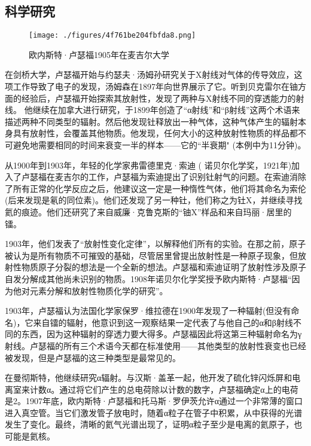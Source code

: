 \subsection{科学研究}
\begin{figure}[ht]
\centering
\texttt{[image: ./figures/4f761be204fbfda8.png]}
\caption{欧内斯特·卢瑟福1905年在麦吉尔大学} \label{fig_Ernest_4}
\end{figure}

在剑桥大学，卢瑟福开始与约瑟夫·汤姆孙研究关于X射线对气体的传导效应，这项工作导致了电子的发现，汤姆森在1897年向世界展示了它。听到贝克雷尔在铀方面的经验后，卢瑟福开始探索其放射性，发现了两种与X射线不同的穿透能力的射线。 他继续在加拿大进行研究，于1899年创造了“α射线”和“β射线”这两个术语来描述两种不同类型的辐射。然后他发现钍释放出一种气体，这种气体产生的辐射本身具有放射性，会覆盖其他物质。他发现，任何大小的这种放射性物质的样品都不可避免地需要相同的时间来衰变一半的样本——它的“半衰期" (本例中为11分钟)。

从1900年到1903年，年轻的化学家弗雷德里克·索迪 ( 诺贝尔化学奖，1921年)加入了卢瑟福在麦吉尔的工作，卢瑟福为索迪提出了识别钍射气的问题。在索迪消除了所有正常的化学反应之后，他建议这一定是一种惰性气体，他们将其命名为索伦(后来发现是氡的同位素)。他们还发现了另一种钍，他们称之为钍X，并继续寻找氦的痕迹。他们还研究了来自威廉·克鲁克斯的“铀X”样品和来自玛丽·居里的镭。

1903年，他们发表了“放射性变化定律”，以解释他们所有的实验。在那之前，原子被认为是所有物质不可摧毁的基础，尽管居里曾提出放射性是一种原子现象，但放射性物质原子分裂的想法是一个全新的想法。卢瑟福和索迪证明了放射性涉及原子自发分解成其他尚未识别的物质。1908年诺贝尔化学奖授予欧内斯特·卢瑟福“因为他对元素分解和放射性物质化学的研究”。

1903年，卢瑟福认为法国化学家保罗·维拉德在1900年发现了一种辐射(但没有命名)，它来自镭的辐射，他意识到这一观察结果一定代表了与他自己的α和β射线不同的东西，因为这种辐射的穿透力要大得多。卢瑟福因此将这第三种辐射命名为γ射线。卢瑟福的所有三个术语今天都在标准使用——其他类型的放射性衰变也已经被发现，但是卢瑟福的这三种类型是最常见的。

在曼彻斯特，他继续研究α辐射。与汉斯·盖革一起，他开发了硫化锌闪烁屏和电离室来计数α。通过将它们产生的总电荷除以计数的数字，卢瑟福确定α上的电荷是2。1907年底，欧内斯特·卢瑟福和托马斯·罗伊茨允许α通过一个非常薄的窗口进入真空管。当它们激发管子放电时，随着α粒子在管子中积累，从中获得的光谱发生了变化。最终，清晰的氦气光谱出现了，证明α粒子至少是电离的氦原子，也可能是氦核。

